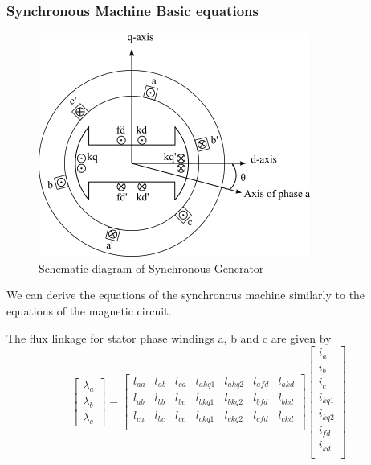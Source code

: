 \subsubsection{Synchronous Machine Basic equations}

\begin{figure}[h]
	\centering
	\includegraphics[scale=1]{img/SynchronousGenerator.png} 
	\caption{Schematic diagram of Synchronous Generator}
	\label{fig:SynGenerator}
\end{figure}


We can derive the equations of the synchronous machine similarly to the equations of the magnetic circuit.

The flux linkage for stator phase windings a, b and c are given by
\begin{equation} \label{eq:FluxStator}
	\begin{bmatrix}
		\lambda_a \\
		\lambda_b \\
		\lambda_c
	\end{bmatrix}
	=
	\begin{bmatrix}
		l_{aa} & l_{ab} & l_{ca} & l_{akq1} & l_{akq2} & l_{afd} & l_{akd} \\  
		l_{ab} & l_{bb} & l_{bc} & l_{bkq1} & l_{bkq2} & l_{bfd} & l_{bkd} \\  
		l_{ca} & l_{bc} & l_{cc} & l_{ckq1} & l_{ckq2} & l_{cfd} & l_{ckd} \\  
	\end{bmatrix}
	\begin{bmatrix}
		i_a \\
		i_b \\
		i_c \\
		i_{kq1} \\
		i_{kq2} \\
		i_{fd} \\
		i_{kd} \\
	\end{bmatrix}
\end{equation}

